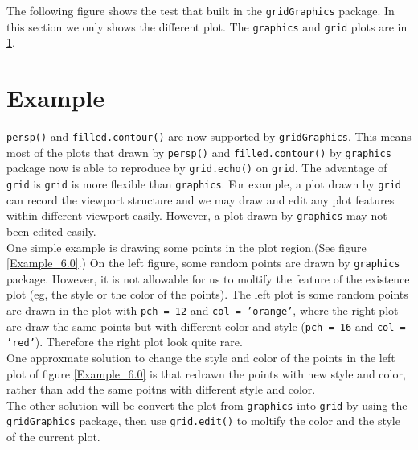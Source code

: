 \documentclass[paper=a4, fontsize=11pt]{report}
\begin{document}
The following figure shows the test that built in the \texttt{gridGraphics} package. In this section we only shows the different plot. The \texttt{graphics} and \texttt{grid} plots are in \ref{}.\\



\chapter{Example}
\texttt{persp()} and \texttt{filled.contour()} are now supported by \texttt{gridGraphics}. This means most of the plots that drawn by \texttt{persp()} and \texttt{filled.contour()} by \texttt{graphics} package now is able to reproduce by \texttt{grid.echo()} on \texttt{grid}. The advantage of \texttt{grid} is \texttt{grid} is more flexible than \texttt{graphics}. For example, a plot drawn by \texttt{grid} can record the viewport structure and we may draw and edit any plot features within different viewport easily. However, a plot drawn by \texttt{graphics} may not been edited easily.\\

One simple example is drawing some points in the plot region.(See figure \ref{Example_6.0}.) On the left figure, some random points are drawn by \texttt{graphics} package. However, it is not allowable for us to moltify the feature of the existence plot (eg, the style or the color of the points). The left plot is some random points are drawn in the plot with \texttt{pch = 12} and \texttt{col = 'orange'}, where the right plot are draw the same points but with different color and style (\texttt{pch = 16} and \texttt{col = 'red'}). Therefore the right plot look quite rare.\\

One approxmate solution to change the style and color of the points in the left plot of figure \ref{Example_6.0} is that redrawn the points with new style and color, rather than add the same poitns with different style and color.\\

The other solution will be convert the plot from \texttt{graphics} into \texttt{grid} by using the \texttt{gridGraphics} package, then use \texttt{grid.edit()} to moltify the color and the style of the current plot.\\
\end{document}
